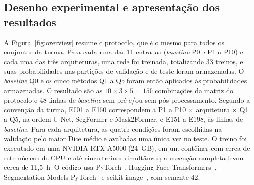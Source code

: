 \documentclass[final,5p,times,twocolumn]{elsarticle}
\begin{document}
\subsection{Desenho experimental e apresentação dos resultados}\label{subsec:experimental_design}

A Figura~\ref{fig:overview} resume o protocolo, que é o mesmo para todos os conjuntos da turma. Para cada uma das 11 entradas (\textit{baseline} P0 e P1 a P10) e cada uma das três arquiteturas, uma rede foi treinada, totalizando 33 treinos, e suas probabilidades nas partições de validação e de teste foram armazenadas. O \textit{baseline} Q0 e os cinco métodos Q1 a Q5 foram então aplicados às probabilidades armazenadas. O resultado são as $10\times3\times5=150$ combinações da matriz do protocolo e 48 linhas de \textit{baseline} sem pré e/ou sem pós-processamento. Segundo a convenção da turma, E001 a E150 correspondem a P1 a P10 $\times$ arquitetura $\times$ Q1 a Q5, na ordem U-Net, SegFormer e Mask2Former, e E151 a E198, às linhas de \textit{baseline}. Para cada arquitetura, as quatro condições foram escolhidas na validação pelo maior Dice médio e avaliadas uma única vez no teste. O treino foi executado em uma NVIDIA RTX A5000 (24~GB), em um contêiner com cerca de sete núcleos de CPU e até cinco treinos simultâneos; a execução completa levou cerca de 11,5~h. O código usa PyTorch~\cite{paszke2019pytorch}, Hugging Face Transformers~\cite{wolf2020transformers}, Segmentation Models PyTorch~\cite{iakubovskii2019smp} e scikit-image~\cite{vanderwalt2014skimage}, com semente 42.
\end{document}
